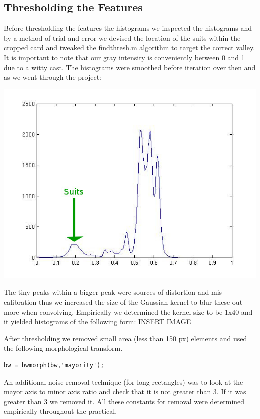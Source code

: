 \documentclass[11pt]{article}
\theoremstyle{plain}
\theoremstyle{definition}
\begin{document}
\subsection{Thresholding the Features}
Before thresholding the features the histograms 
we inspected the histograms and by a method of trial and error we devised the location of the suits within the cropped card and tweaked the 
findthresh.m algorithm to target the correct
valley. It is important to note that our gray
intensity is conveniently between 0 and 1 due to a witty cast. The histograms were smoothed before iteration over then and as we went through the project:
\begin{center}
        \includegraphics[scale=0.7]{suit.jpg}
\end{center}
The tiny peaks within a bigger peak were sources of distortion and mis-calibration thus we increased the size of the Gaussian kernel to blur these out more when convolving. Empirically we determined the kernel size to be 1x40 and it yielded histograms of the following form:
\newline\newline
INSERT IMAGE

After thresholding we removed small area (less than 150 px) elements and used the following morphological transform.  
\begin{lstlisting}
bw = bwmorph(bw,'mayority');
\end{lstlisting}
An additional noise removal technique (for long rectangles) was to look at the mayor axis to minor axis ratio and check that
it is not greater than 3. If it was greater than 3 we removed it. All these constants for removal were determined empirically
throughout the practical.
\end{document}
